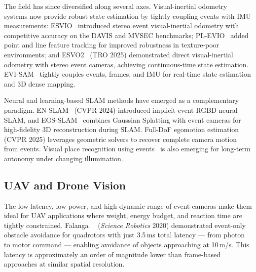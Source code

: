 The field has since diversified along several axes. Visual-inertial odometry systems now provide robust state estimation by tightly coupling events with IMU measurements: ESVIO~\cite{chen2023esvio} introduced stereo event visual-inertial odometry with competitive accuracy on the DAVIS and MVSEC benchmarks; PL-EVIO~\cite{guan2023plevio} added point and line feature tracking for improved robustness in texture-poor environments; and ESVO2~\cite{zhou2025esvo2} (TRO 2025) demonstrated direct visual-inertial odometry with stereo event cameras, achieving continuous-time state estimation. EVI-SAM~\cite{guan2024evisam} tightly couples events, frames, and IMU for real-time state estimation and 3D dense mapping.

Neural and learning-based SLAM methods have emerged as a complementary paradigm. EN-SLAM~\cite{deng2024enslam} (CVPR 2024) introduced implicit event-RGBD neural SLAM, and EGS-SLAM~\cite{chen2025egsslam} combines Gaussian Splatting with event cameras for high-fidelity 3D reconstruction during SLAM. Full-DoF egomotion estimation~\cite{nunes2025egomotion} (CVPR 2025) leverages geometric solvers to recover complete camera motion from events. Visual place recognition using events~\cite{fischer2024nycvpr} is also emerging for long-term autonomy under changing illumination.


\subsection{UAV and Drone Vision}
\label{sec:appl_uav}

The low latency, low power, and high dynamic range of event cameras make them ideal for UAV applications where weight, energy budget, and reaction time are tightly constrained. Falanga~\etal~\cite{falanga2020obstacle} (\textit{Science Robotics} 2020) demonstrated event-only obstacle avoidance for quadrotors with just 3.5\,ms total latency --- from photon to motor command --- enabling avoidance of objects approaching at 10\,m/s. This latency is approximately an order of magnitude lower than frame-based approaches at similar spatial resolution.

